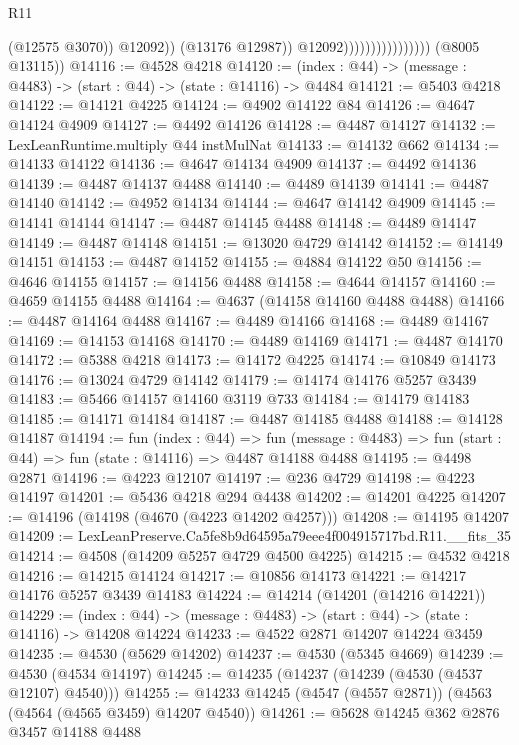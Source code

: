 \begin{lexlean}{R11}
\begin{coremodule}
                                              (@12575 @3070))
                                            @12092))
                                        (@13176 @12987))
                                      @12092))))))))))))))))
      (@8005 @13115))
@14116 := @4528 @4218
@14120 := (index : @44) -> (message : @4483) -> (start : @44) -> (state : @14116) -> @4484
@14121 := @5403 @4218
@14122 := @14121 @4225
@14124 := @4902 @14122 @84
@14126 := @4647 @14124 @4909
@14127 := @4492 @14126
@14128 := @4487 @14127
@14132 := LexLeanRuntime.multiply @44 instMulNat
@14133 := @14132 @662
@14134 := @14133 @14122
@14136 := @4647 @14134 @4909
@14137 := @4492 @14136
@14139 := @4487 @14137 @4488
@14140 := @4489 @14139
@14141 := @4487 @14140
@14142 := @4952 @14134
@14144 := @4647 @14142 @4909
@14145 := @14141 @14144
@14147 := @4487 @14145 @4488
@14148 := @4489 @14147
@14149 := @4487 @14148
@14151 := @13020 @4729 @14142
@14152 := @14149 @14151
@14153 := @4487 @14152
@14155 := @4884 @14122 @50
@14156 := @4646 @14155
@14157 := @14156 @4488
@14158 := @4644 @14157
@14160 := @4659 @14155 @4488
@14164 := @4637 (@14158 @14160 @4488 @4488)
@14166 := @4487 @14164 @4488
@14167 := @4489 @14166
@14168 := @4489 @14167
@14169 := @14153 @14168
@14170 := @4489 @14169
@14171 := @4487 @14170
@14172 := @5388 @4218
@14173 := @14172 @4225
@14174 := @10849 @14173
@14176 := @13024 @4729 @14142
@14179 := @14174 @14176 @5257 @3439
@14183 := @5466 @14157 @14160 @3119 @733
@14184 := @14179 @14183
@14185 := @14171 @14184
@14187 := @4487 @14185 @4488
@14188 := @14128 @14187
@14194 := fun (index : @44) =>
  fun (message : @4483) => fun (start : @44) => fun (state : @14116) => @4487 @14188 @4488
@14195 := @4498 @2871
@14196 := @4223 @12107
@14197 := @236 @4729
@14198 := @4223 @14197
@14201 := @5436 @4218 @294 @4438
@14202 := @14201 @4225
@14207 := @14196 (@14198 (@4670 (@4223 @14202 @4257)))
@14208 := @14195 @14207
@14209 := LexLeanPreserve.Ca5fe8b9d64595a79eee4f004915717bd.R11.__fits_35
@14214 := @4508 (@14209 @5257 @4729 @4500 @4225)
@14215 := @4532 @4218
@14216 := @14215 @14124
@14217 := @10856 @14173
@14221 := @14217 @14176 @5257 @3439 @14183
@14224 := @14214 (@14201 (@14216 @14221))
@14229 := (index : @44) -> (message : @4483) -> (start : @44) -> (state : @14116) -> @14208 @14224
@14233 := @4522 @2871 @14207 @14224 @3459
@14235 := @4530 (@5629 @14202)
@14237 := @4530 (@5345 @4669)
@14239 := @4530 (@4534 @14197)
@14245 := @14235 (@14237 (@14239 (@4530 (@4537 @12107) @4540)))
@14255 := @14233 @14245 (@4547 (@4557 @2871)) (@4563 (@4564 (@4565 @3459) @14207 @4540))
@14261 := @5628 @14245 @362 @2876 @3457 @14188 @4488

\end{coremodule}
\end{lexlean}

